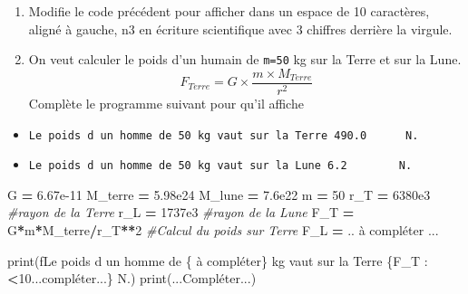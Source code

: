 \documentclass[
]{book}
\newenvironment{Shaded}{\begin{snugshade}}{\end{snugshade}}
\newcommand{\BuiltInTok}[1]{#1}
\newcommand{\CommentTok}[1]{\textcolor[rgb]{0.56,0.35,0.01}{\textit{#1}}}
\newcommand{\DecValTok}[1]{\textcolor[rgb]{0.00,0.00,0.81}{#1}}
\newcommand{\FloatTok}[1]{\textcolor[rgb]{0.00,0.00,0.81}{#1}}
\newcommand{\NormalTok}[1]{#1}
\newcommand{\OperatorTok}[1]{\textcolor[rgb]{0.81,0.36,0.00}{\textbf{#1}}}
\newcommand{\SpecialCharTok}[1]{\textcolor[rgb]{0.00,0.00,0.00}{#1}}
\newcommand{\SpecialStringTok}[1]{\textcolor[rgb]{0.31,0.60,0.02}{#1}}
\providecommand{\tightlist}{%
  \setlength{\itemsep}{0pt}\setlength{\parskip}{0pt}}
\def\tightlist{}
\begin{document}
\begin{enumerate}
\def\labelenumi{\arabic{enumi}.}
\setcounter{enumi}{2}
\item
  Modifie le code précédent pour afficher dans un espace de 10 caractères, aligné à gauche, n3 en écriture scientifique avec 3 chiffres derrière la virgule.
\item
  On veut calculer le poids d'un humain de \texttt{m=50} kg sur la Terre et sur la Lune. \[F_{Terre}=G\times \frac{m\times M_{Terre}}{r^2}\] Complète le programme suivant pour qu'il affiche
\end{enumerate}

\begin{itemize}
\tightlist
\item
  \texttt{Le\ poids\ d\ un\ homme\ de\ 50\ kg\ vaut\ sur\ la\ Terre\ 490.0\ \ \ \ \ \ N.}
\item
  \texttt{Le\ poids\ d\ un\ homme\ de\ 50\ kg\ vaut\ sur\ la\ Lune\ 6.2\ \ \ \ \ \ \ \ N.}
\end{itemize}

\begin{Shaded}
\begin{Highlighting}[]
\NormalTok{G }\OperatorTok{=} \FloatTok{6.67e{-}11}
\NormalTok{M\_terre }\OperatorTok{=} \FloatTok{5.98e24}
\NormalTok{M\_lune }\OperatorTok{=} \FloatTok{7.6e22}
\NormalTok{m }\OperatorTok{=} \DecValTok{50}
\NormalTok{r\_T }\OperatorTok{=} \FloatTok{6380e3} \CommentTok{\#rayon de la Terre }
\NormalTok{r\_L }\OperatorTok{=} \FloatTok{1737e3} \CommentTok{\#rayon de la Lune }
\NormalTok{F\_T }\OperatorTok{=}\NormalTok{ G}\OperatorTok{*}\NormalTok{m}\OperatorTok{*}\NormalTok{M\_terre}\OperatorTok{/}\NormalTok{r\_T}\OperatorTok{**}\DecValTok{2} \CommentTok{\#Calcul du poids sur Terre}
\NormalTok{F\_L }\OperatorTok{=}\NormalTok{ .. à compléter ... }

\BuiltInTok{print}\NormalTok{(}\SpecialStringTok{f\textquotesingle{}Le poids d un homme de }\SpecialCharTok{\{} \SpecialCharTok{à}\NormalTok{ compl}\SpecialCharTok{é}\NormalTok{ter}\SpecialCharTok{\}}\SpecialStringTok{ kg vaut sur la Terre }\SpecialCharTok{\{}\NormalTok{F\_T }\SpecialCharTok{:} \OperatorTok{\textless{}}\FloatTok{10.}\SpecialCharTok{..}\NormalTok{compl}\SpecialCharTok{é}\NormalTok{ter}\SpecialCharTok{...\}}\SpecialStringTok{ N.\textquotesingle{}}\NormalTok{)}
\BuiltInTok{print}\NormalTok{(...Compléter...)}
\end{Highlighting}
\end{Shaded}

\newpage
\end{document}
